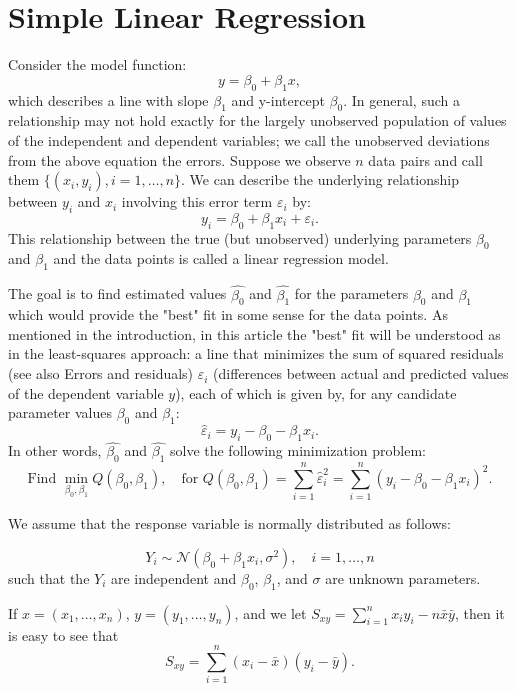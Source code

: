 \documentclass[12pt,a4paper,oneside]{book} %
\begin{document}
	\section{Simple Linear Regression}

Consider the model function:
\[
y = \beta_0 + \beta_1 x,
\]
which describes a line with slope $\beta_1$ and y-intercept $\beta_0$. In general, such a relationship may not hold exactly for the largely unobserved population of values of the independent and dependent variables; we call the unobserved deviations from the above equation the errors. Suppose we observe $n$ data pairs and call them $\{(x_i, y_i), i = 1, \ldots, n\}$. We can describe the underlying relationship between $y_i$ and $x_i$ involving this error term $\varepsilon_i$ by:
\[
y_i = \beta_0 + \beta_1 x_i + \varepsilon_i.
\]
This relationship between the true (but unobserved) underlying parameters $\beta_0$ and $\beta_1$ and the data points is called a linear regression model.

The goal is to find estimated values $\hat{\beta_0}$ and $\hat{\beta_1}$ for the parameters $\beta_0$ and $\beta_1$ which would provide the "best" fit in some sense for the data points. As mentioned in the introduction, in this article the "best" fit will be understood as in the least-squares approach: a line that minimizes the sum of squared residuals (see also Errors and residuals) $\hat{\varepsilon}_i$ (differences between actual and predicted values of the dependent variable $y$), each of which is given by, for any candidate parameter values $\beta_0$ and $\beta_1$:
\[
\hat{\varepsilon}_i = y_i - \beta_0 - \beta_1 x_i.
\]
In other words, $\hat{\beta_0}$ and $\hat{\beta_1}$ solve the following minimization problem:
\[
\text{Find } \min_{\beta_0, \beta_1} Q(\beta_0, \beta_1), \quad \text{for } Q(\beta_0, \beta_1) = \sum_{i=1}^{n} \hat{\varepsilon}_i^2 = \sum_{i=1}^{n} (y_i - \beta_0 - \beta_1 x_i)^2.
\]

We assume that the response variable is normally distributed as follows: 

\[ Y_i \sim \mathcal{N}(\beta_0 + \beta_1 x_i, \sigma^2), \quad i = 1, \ldots, n \]
such that the \(Y_i\) are independent and \(\beta_0\), \(\beta_1\), and \(\sigma\) are unknown parameters.

If $x = (x_1, \ldots, x_n)$, $y = (y_1, \ldots, y_n)$, and we let $S_{xy} = \sum_{i=1}^{n} x_i y_i - n\bar{x}\bar{y}$, then it is easy to see that
\[ S_{xy} = \sum_{i=1}^{n} (x_i - \bar{x})(y_i - \bar{y}). \]
\end{document}
